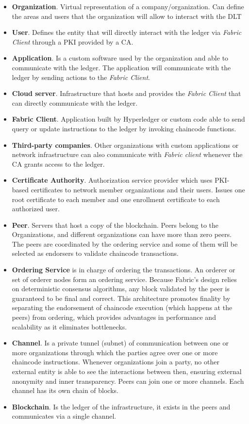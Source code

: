 \begin{itemize}
\item \textbf{Organization}. Virtual representation of a company/organization. Can define the areas and users that the organization will allow to interact with the \ac{DLT} 
\item \textbf{User}. Defines the entity that will directly interact with the ledger via \emph{Fabric Client} through a \ac{PKI} provided by a \ac{CA}.
\item \textbf{Application}. Is a custom software used by the organization and able to communicate with the ledger. The application will communicate with the ledger by sending actions to the \emph{Fabric Client}.
\item \textbf{Cloud server}. Infrastructure that hosts and provides the \emph{Fabric Client} that can directly communicate with the ledger.
\item \textbf{Fabric Client}. Application built by Hyperledger or custom code able to send query or update instructions to the ledger by invoking chaincode functions.
\item \textbf{Third-party companies}. Other organizations with custom applications or network infrastructure can also communicate with \emph{Fabric client} whenever the \ac{CA} grants access to the ledger.
\item \textbf{Certificate Authority}. Authorization service provider which uses \ac{PKI}-based certificates to network member organizations and their users. Issues one root certificate to each member and one enrollment certificate to each authorized user.
\item \textbf{Peer}. Servers that host a copy of the blockchain. Peers belong to the Organizations, and different organizations can have more than zero peers. The peers are coordinated by the ordering service and some of them will be selected as endorsers to validate chaincode transactions.
\item \textbf{Ordering Service} is in charge of ordering the transactions. An orderer or set of orderer nodes form an ordering service. Because Fabric’s design relies on deterministic consensus algorithms, any block validated by the peer is guaranteed to be final and correct. This architecture promotes finality by separating the endorsement of chaincode execution (which happens at the peers) from ordering, which provides advantages in performance and scalability as it eliminates bottlenecks.
\item \textbf{Channel}. Is a private tunnel (subnet) of communication between one or more organizations through which the parties agree over one or more chaincode instructions. Whenever organizations join a party, no other external entity is able to see the interactions between then, ensuring external anonymity and inner transparency. Peers can join one or more channels. Each channel has its own chain of blocks.
\item \textbf{Blockchain}. Is the ledger of the infrastructure, it exists in the peers and communicates via a single channel.
\end{itemize}

